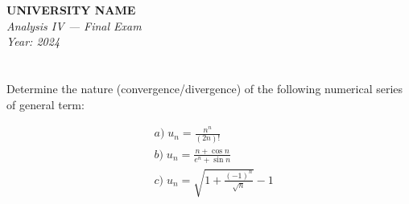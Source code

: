 \documentclass[12pt]{article}
\begin{document}
\begin{center}
  \Large\textbf{UNIVERSITY NAME} \\[1em]
  \large\textit{Analysis IV — Final Exam} \\[0.5em]
  \large\textit{Year: 2024} \\[2em]
\end{center}

\vspace{0.5cm}

\section{}
Determine the nature (convergence/divergence) of the following numerical series of general term:

\[
\begin{aligned}
&a) \; u_n = \frac{n^n}{(2n)!} \\
&b) \; u_n = \frac{n + \cos n}{e^n + \sin n} \\
&c) \; u_n = \sqrt{1 + \frac{(-1)^n}{\sqrt{n}}} - 1
\end{aligned}
\]
\end{document}

